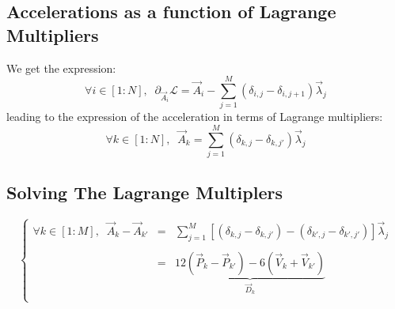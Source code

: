 \documentclass[aps,12pt]{revtex4}
\begin{document}
\subsection{Accelerations as a function of Lagrange Multipliers}
We get the expression:
\begin{equation}
	\forall i \in [1:N],\;\; \partial_{\vec{A}_i} \mathcal{L} = \vec{A}_i 
	- \sum_{j=1}^M \left( \delta_{i,j} - \delta_{i,j+1}\right)\vec{\lambda}_j
\end{equation}
leading to the expression of the acceleration in terms of Lagrange multipliers:
\begin{equation}
\boxed{
	\forall k \in [1:N],\;\;\vec{A}_k = \sum_{j=1}^M \left( \delta_{k,j} - \delta_{k,j'}\right)\vec{\lambda}_j
}
\end{equation}

\subsection{Solving The Lagrange Multiplers}
\begin{equation}
\left\lbrace
\begin{array}{rcl}
	\forall k \in [1:M],\;\; \vec{A}_k - \vec{A}_{k'} & = & \displaystyle \sum_{j=1}^M \left[\left( \delta_{k,j} - \delta_{k,j'}\right) - \left( \delta_{k',j} - \delta_{k',j'}\right)\right]\vec{\lambda}_j \\
	\\
	 & = & \underbrace{12\left(\vec{P}_k-\vec{P}_{k'}\right) - 6 \left(\vec{V}_k+\vec{V}_{k'}\right)}_{\vec{D}_k}\\
\end{array}	
\right. 
\end{equation}
\end{document}
